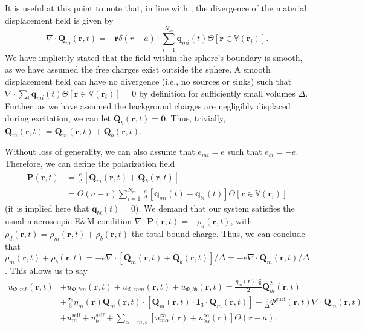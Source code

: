 \documentclass{article}
\begin{document}
It is useful at this point to note that, in line with \citet{huttner1992quantization}, the divergence of the material displacement field is given by
\begin{equation}
\nabla\cdot\mathbf{Q}_m(\mathbf{r},t) = -\hat{\mathbf{r}}\delta(r - a)\cdot\sum_{i = 1}^{N_m}\mathbf{q}_{mi}(t)\Theta[\mathbf{r}\in\mathbb{V}(\mathbf{r}_i)].
\end{equation}
We have implicitly stated that the field within the sphere's boundary is smooth, as we have assumed the free charges exist outside the sphere. A smooth displacement field can have no divergence (i.e., no sources or sinks) such that $\nabla\cdot\sum_i\mathbf{q}_{mi}(t)\Theta[\mathbf{r}\in\mathbb{V}(\mathbf{r}_i)] = 0$ by definition for sufficiently small volumes $\Delta$. Further, as we have assumed the background charges are negligibly displaced during excitation, we can let $\mathbf{Q}_b(\mathbf{r},t) = \bm{0}$. Thus, trivially, $\mathbf{Q}_m(\mathbf{r},t) = \mathbf{Q}_m(\mathbf{r},t) + \mathbf{Q}_b(\mathbf{r},t)$.

Without loss of generality, we can also assume that $e_{mi} = e$ such that $e_{bi} = -e$. Therefore, we can define the polarization field
\begin{equation}
\begin{split}
\mathbf{P}(\mathbf{r},t) &= \frac{e}{\Delta}\left[\mathbf{Q}_m(\mathbf{r},t) + \mathbf{Q}_b(\mathbf{r},t)\right]\\
&= \Theta(a - r)\sum_{i = 1}^{N_m}\frac{e}{\Delta}\left[\mathbf{q}_{mi}(t) - \mathbf{q}_{bi}(t)\right]\Theta[\mathbf{r}\in\mathbb{V}(\mathbf{r}_i)]
\end{split}
\end{equation}
(it is implied here that $\mathbf{q}_{bi}(t) = 0$). We demand that our system satisfies the usual macroscopic E\&M condition $\nabla\cdot\mathbf{P}(\mathbf{r},t) = -\rho_d(\mathbf{r},t)$, with $\rho_d(\mathbf{r},t) = \rho_m(\mathbf{r},t) + \rho_b(\mathbf{r},t)$ the total bound charge. Thus, we can conclude that $\rho_m(\mathbf{r},t) + \rho_b(\mathbf{r},t) = -e\nabla\cdot\left[\mathbf{Q}_m(\mathbf{r},t) + \mathbf{Q}_b(\mathbf{r},t)\right]/\Delta = -e\nabla\cdot\mathbf{Q}_m(\mathbf{r},t)/\Delta$. This allows us to say
\begin{equation}
\begin{split}
u_{\Phi,mb}(\mathbf{r},t) &+ u_{\Phi,bm}(\mathbf{r},t) + u_{\Phi,mm}(\mathbf{r},t) + u_{\Phi,bb}(\mathbf{r},t) = \frac{\eta_m(\mathbf{r})\omega_0^2}{2}\mathbf{Q}_m^2(\mathbf{r},t)\\
&+ \frac{\sigma_0}{3}\eta_m(\mathbf{r})\mathbf{Q}_m(\mathbf{r},t)\cdot\left[\mathbf{Q}_m(\mathbf{r},t)\cdot\bm{1}_3\cdot\mathbf{Q}_m(\mathbf{r},t)\right] -\frac{e}{\Delta}\Phi^\mathrm{surf}(\mathbf{r},t)\nabla\cdot\mathbf{Q}_m(\mathbf{r},t)\\
&+ u_m^\mathrm{self} + u_b^\mathrm{self} +\sum_{\alpha = m,b}\left[u_{m\alpha}^\infty(\mathbf{r}) + u_{b\alpha}^\infty(\mathbf{r})\right]\Theta(r - a).
\end{split}
\end{equation}
\end{document}
